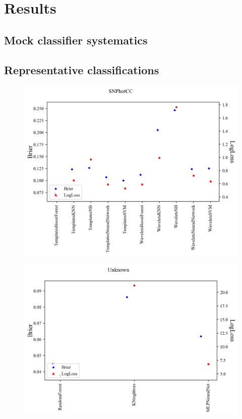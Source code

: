 \section{Results}
\label{sec:results}

\subsection{Mock classifier systematics}
\label{sec:mockresults}

\subsection{Representative classifications}
\label{sec:realresults}

\begin{figure}
	\begin{center}
		\includegraphics[width=\textwidth]{./fig/SNPhotCC.png}\\
		\caption{}
		\label{fig:snphotcc_metric_compare}
	\end{center}
\end{figure}

\begin{figure}
	\begin{center}
		\includegraphics[width=\textwidth]{./fig/Unknown.png}\\
		\caption{}
		\label{fig:unknown_metric_compare}
	\end{center}
\end{figure}
